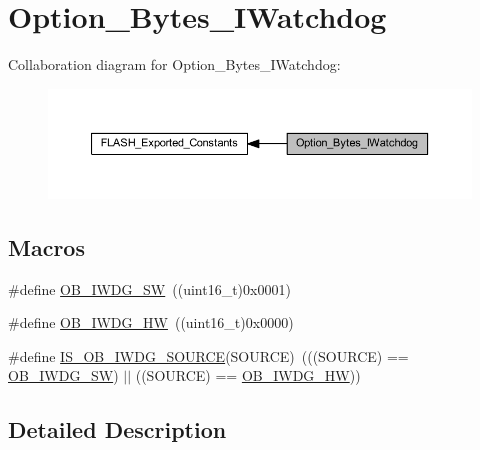 \hypertarget{group___option___bytes___i_watchdog}{}\section{Option\+\_\+\+Bytes\+\_\+\+I\+Watchdog}
\label{group___option___bytes___i_watchdog}
Collaboration diagram for Option\+\_\+\+Bytes\+\_\+\+I\+Watchdog\+:
\nopagebreak
\begin{figure}[H]
\begin{center}
\leavevmode
\includegraphics[width=350pt]{group___option___bytes___i_watchdog}
\end{center}
\end{figure}
\subsection*{Macros}
\begin{DoxyCompactItemize}
\item 
\#define \hyperlink{group___option___bytes___i_watchdog_ga5a357e232c955444c3f2ccb9a937ffce}{O\+B\+\_\+\+I\+W\+D\+G\+\_\+\+SW}~((uint16\+\_\+t)0x0001)
\item 
\#define \hyperlink{group___option___bytes___i_watchdog_gadfcbfa963d79c339ec8e2d5a7734e47a}{O\+B\+\_\+\+I\+W\+D\+G\+\_\+\+HW}~((uint16\+\_\+t)0x0000)
\item 
\#define \hyperlink{group___option___bytes___i_watchdog_gaf2871652c08e76499d9449be6556f12c}{I\+S\+\_\+\+O\+B\+\_\+\+I\+W\+D\+G\+\_\+\+S\+O\+U\+R\+CE}(S\+O\+U\+R\+CE)~(((S\+O\+U\+R\+CE) == \hyperlink{group___option___bytes___i_watchdog_ga5a357e232c955444c3f2ccb9a937ffce}{O\+B\+\_\+\+I\+W\+D\+G\+\_\+\+SW}) $\vert$$\vert$ ((S\+O\+U\+R\+CE) == \hyperlink{group___option___bytes___i_watchdog_gadfcbfa963d79c339ec8e2d5a7734e47a}{O\+B\+\_\+\+I\+W\+D\+G\+\_\+\+HW}))
\end{DoxyCompactItemize}


\subsection{Detailed Description}


